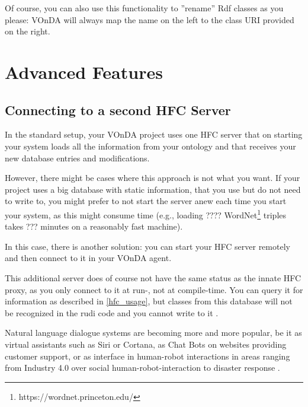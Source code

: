 \documentclass[a4paper]{report}
\newcommand{\vonda}{VOnDA\xspace}
\begin{document}
Of course, you can also use this functionality to ''rename'' Rdf classes as you
please: \vonda will always map the name on the left to the class URI provided
on the right.

\section{Advanced Features}

\subsection{Connecting to a second HFC Server}
In the standard setup, your \vonda project uses one HFC server that on starting your system loads all the information from your ontology and that receives your new database entries and modifications.

However, there might be cases where this approach is not what you want. If your project uses a big database with static information, that you use but do not need to write to, you might prefer to not start the server anew each time you start your system, as this might consume time (e.g., loading ???? WordNet\footnote{https://wordnet.princeton.edu/} triples takes ??? minutes on a reasonably fast machine).


In this case, there is another solution: you can start your HFC server remotely and then connect to it in your \vonda agent.



This additional server does of course not have the same status as the innate HFC proxy, as you only connect to it at run-, not at compile-time. You can query it for information as described in \ref{hfc_usage}, but classes from this database will not be recognized in the rudi code and you cannot write to it . 


%
Natural language dialogue systems are becoming more and more popular, be it as
virtual assistants such as Siri or Cortana, as Chat Bots on websites providing
customer support, or as interface in human-robot interactions in areas ranging
from Industry 4.0 \citep{schwartz2016hybrid} over social human-robot-interaction
\citep{alize2010} to disaster response \citep{kruijff2015tradr}.
\end{document}
